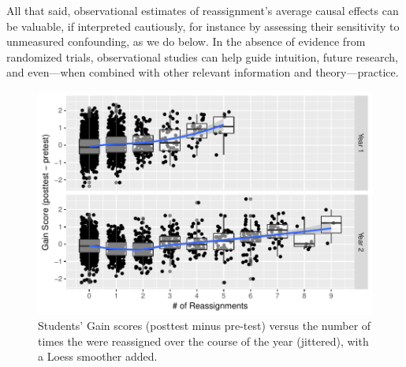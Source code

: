 \documentclass[12pt]{article}\usepackage[]{graphicx}\usepackage[]{color}
\makeatletter
\def\maxwidth{ %
  \ifdim\Gin@nat@width>\linewidth
    \linewidth
  \else
    \Gin@nat@width
  \fi
}
\makeatother
\begin{document}
All that said, observational estimates of reassignment's average
causal effects can be valuable, if interpreted cautiously, for
instance by assessing their sensitivity to unmeasured confounding, as
we do below.
In the absence of evidence from randomized trials, observational
studies can help guide intuition, future research, and even---when
combined with other relevant information and theory---practice.







\begin{figure}
  \centering

\includegraphics[width=\maxwidth]{figure/cpYyear-1} 

\caption{Students' Gain scores (posttest minus pre-test) versus the number of times the were reassigned over the course of the year (jittered), with a Loess smoother added.}
\label{fig:cpYyear}
\end{figure}
\end{document}
